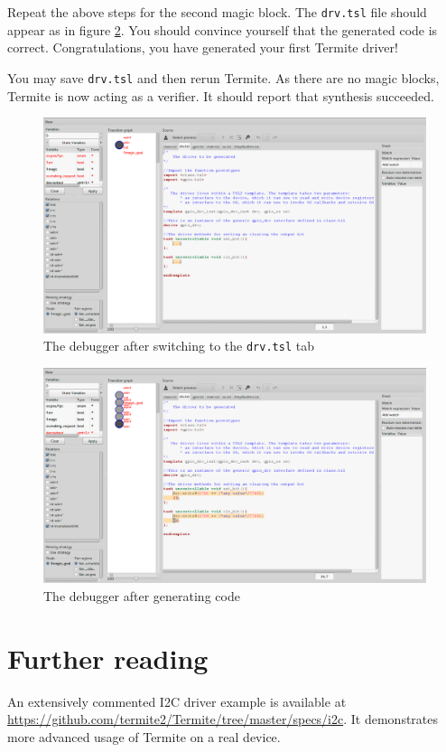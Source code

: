 \documentclass{article}
\newcommand{\code}[1]{\texttt{#1}}
\begin{document}
Repeat the above steps for the second magic block. The \code{drv.tsl} file should appear as in figure \ref{fig:screenshot_after}. You should convince yourself that the generated code is correct. Congratulations, you have generated your first Termite driver!

You may save \code{drv.tsl} and then rerun Termite. As there are no magic blocks, Termite is now acting as a verifier. It should report that synthesis succeeded. 

\begin{figure}
    \center
    \includegraphics[width=\linewidth]{figs/debugger1.png}
    \caption{The debugger after switching to the \code{drv.tsl} tab}
    \label{fig:screenshot_before}
\end{figure}

\begin{figure}
    \center
    \includegraphics[width=\linewidth]{figs/debugger2.png}
    \caption{The debugger after generating code}
    \label{fig:screenshot_after}
\end{figure}

\section{Further reading}
An extensively commented I2C driver example is available at \url{https://github.com/termite2/Termite/tree/master/specs/i2c}. It demonstrates more advanced usage of Termite on a real device. 


 
\end{document}
